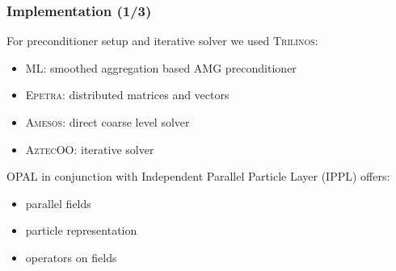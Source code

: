 \documentclass[xcolor=pdftex,table,10pt]{beamer}
\newcommand{\opal}{\textsc{OPAL }}
\begin{document}
	\begin{frame}
		\frametitle{Implementation (1/3)}

		For preconditioner setup and iterative solver we used \textsc{Trilinos}:
		\begin{itemize}
			\item \textsc{ML}: smoothed aggregation based AMG preconditioner
			\item \textsc{Epetra}: distributed matrices and vectors
			\item \textsc{Amesos}: direct coarse level solver
			\item \textsc{AztecOO}: iterative solver
		\end{itemize}

		\vspace{0.8cm}

		\opal in conjunction with Independent Parallel Particle Layer (\textsc{IPPL}) offers:
		\begin{itemize}
			\item parallel fields
			\item particle representation
			\item operators on fields
		\end{itemize}

	\end{frame}
\end{document}
